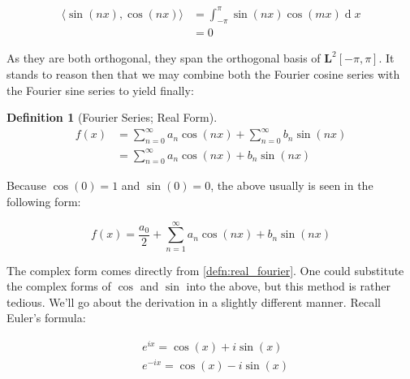\documentclass[12pt,a4paper]{report}
\DeclareMathOperator{\deriv}{d}
\theoremstyle{thms}
\theoremstyle{defns}
\newtheorem{definition}{Definition}[section]
\begin{document}
\begin{align}
    \langle \sin(nx), \cos(nx) \rangle & = \int_{-\pi}^{\pi} \sin(nx)\cos(mx) \deriv{x} \\
                                       & = 0
\end{align}

As they are both orthogonal, they span the orthogonal basis of $\mathbf{L}^2[-\pi, \pi]$. It stands to reason then that we may combine both the Fourier cosine series with the Fourier sine series to yield finally:

\begin{definition}[Fourier Series; Real Form]
    \begin{align}
        f(x) & = \sum_{n=0}^{\infty}a_n\cos(nx) + \sum_{n=0}^{\infty}b_n\sin(nx) \\
             & = \sum_{n=0}^{\infty}a_n\cos(nx) + b_n\sin(nx)
    \end{align}
\end{definition}

Because $\cos(0) = 1$ and $\sin(0) = 0$, the above usually is seen in the following form:

\begin{equation}
    f(x) = \dfrac{a_0}{2} + \sum_{n=1}^{\infty}a_n\cos(nx) + b_n\sin(nx)
    \label{defn:real_fourier}
\end{equation}

The complex form comes directly from \eqref{defn:real_fourier}. One could substitute the complex forms of $\cos$ and $\sin$ into the above, but this method is rather tedious. We'll go about the derivation in a slightly different manner. Recall Euler's formula:

\begin{align}
     & e^{ix} = \cos(x) + i\sin(x)\label{eq:euler1}  \\
     & e^{-ix} = \cos(x) - i\sin(x)\label{eq:euler2}
\end{align}
\end{document}
